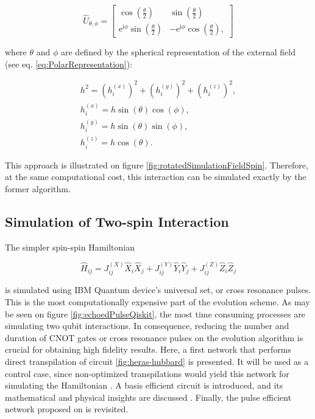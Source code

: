    \begin{equation}
      \hat{U}_{\theta,\phi} = \begin{bmatrix}
        \cos(\frac{\theta}{2}) & \sin(\frac{\theta}{2}) \\
        \mathrm{e}^{\mathrm{i}\phi}\sin(\frac{\theta}{2}) & -\mathrm{e}^{\mathrm{i}\phi}\cos(\frac{\theta}{2}),
      \end{bmatrix}
      \label{eq:UGate}
    \end{equation}

    \noindent where $\theta$ and $\phi$ are defined by the spherical representation of the external field (see eq. \ref{eq:PolarRepresentation}):

    \begin{gather}
      h^2 =  (h_i^{(x)})^2 + (h_i^{(y)})^2 + (h_i^{(z)})^2 ,\\
      h_i^{(x)} = h \sin(\theta)\cos(\phi), \\
      h_i^{(y)} = h \sin(\theta)\sin(\phi), \\
      h_i^{(z)} = h \cos(\theta).
      \label{eq:PolarRepresentation}
    \end{gather}

    This approach is illustrated on figure \ref{fig:rotatedSimulationFieldSpin}. Therefore, at the same computational cost, this interaction can be simulated exactly by the former algorithm.

    

  \subsection{Simulation of Two-spin Interaction}
  \label{subsec:TwoSpinCircuits}

    The simpler spin-spin Hamiltonian

    \begin{equation}
      \hat{H}_{ij} = J_{ij}^{(X)} \hat{X}_i \hat{X}_j + J_{ij}^{(Y)} \hat{Y}_i \hat{Y}_j + J_{ij}^{(Z)} \hat{Z}_i \hat{Z}_j
      \label{eq:SpinSpin}
    \end{equation}

    \noindent is simulated using IBM Quantum device's universal set, or cross resonance pulses. This is the most computationally expensive part of the evolution scheme. As may be seen on figure \ref{fig:echoedPulseQiskit}, the most time consuming processes are simulating two qubit interactions. In consequence, reducing the number and duration of CNOT gates or cross resonance pulses on the evolution algorithm is crucial for obtaining high fidelity results. Here, a first network that performs direct transpilation of circuit \ref{fig:heras-hubbard} is presented. It will be used as a control case, since non-optimized transpilations would yield this network for simulating the Hamiltonian \cite{Qiskit}. A basis efficient circuit is introduced, and its mathematical and physical insights are discussed \cite{BellUniversalCartan}. Finally, the pulse efficient network proposed on \cite{RXZPulseEfficient} is revisited.
    
